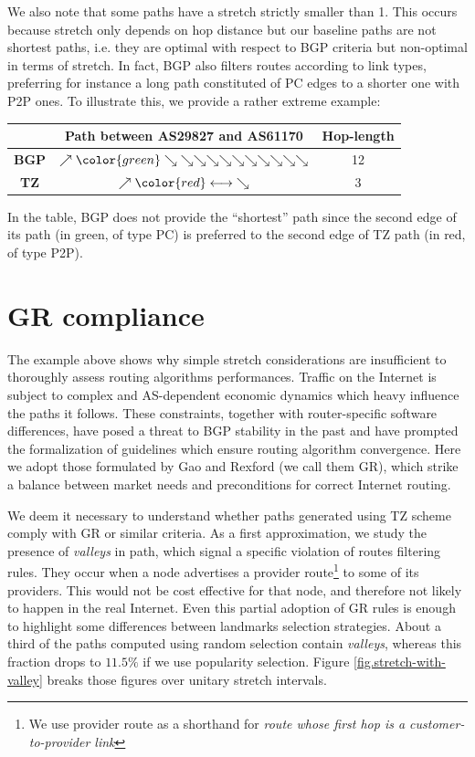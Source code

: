 \documentclass[a4paper,11pt,oneside]{report}
\begin{document}
We also note that some paths have a stretch strictly smaller than 1. This occurs because stretch only depends on hop distance but our baseline paths are not shortest paths, i.e. they are optimal with respect to BGP criteria but non-optimal in terms of stretch. In fact, BGP also filters routes according to link types, preferring for instance a long path constituted of PC edges to a shorter one with P2P ones. To illustrate this, we provide a rather extreme example:

\begin{center}
\begin{tabular}{c|c|c}
&Path between \textbf{AS29827} and \textbf{AS61170}&Hop-length \\
\hline
\textbf{BGP}& $\nearrow {\color{green}\searrow} \searrow \searrow \searrow \searrow \searrow \searrow \searrow \searrow \searrow \searrow$ & 12 \\
\textbf{TZ}& $\nearrow {\color{red}\longleftrightarrow} \searrow$ & 3
\end{tabular}
\end{center}

In the table, BGP does not provide the ``shortest'' path since the second edge of its path (in green, of type PC) is preferred to the second edge of TZ path (in red, of type P2P).

\section{GR compliance}
The example above shows why simple stretch considerations are insufficient to thoroughly assess routing algorithms performances. Traffic on the Internet is subject to complex and AS-dependent economic dynamics which heavy influence the paths it follows. These constraints, together with router-specific software differences, have posed a threat to BGP stability in the past and have prompted the formalization of guidelines which ensure routing algorithm convergence. Here we adopt those formulated by Gao and Rexford \cite{lixingaoStableInternetRouting2001} (we call them GR), which strike a balance between market needs and preconditions for correct Internet routing.

\bigskip
We deem it necessary to understand whether paths generated using TZ scheme comply with GR or similar criteria. 
As a first approximation, we study the presence of \emph{valleys} in path, which signal a specific violation of routes filtering rules. They occur when a node advertises a provider route\footnote{We use provider route as a shorthand for \textit{route whose first hop is a customer-to-provider link}} to some of its providers. This would not be cost effective for that node, and therefore not likely to happen in the real Internet. Even this partial adoption of GR rules is enough to highlight some differences between landmarks selection strategies.
About a third of the paths computed using random selection contain \textit{valleys}, whereas this fraction drops to $11.5\%$ if we use popularity selection. Figure \ref{fig.stretch-with-valley} breaks those figures over unitary stretch intervals. 
\end{document}
